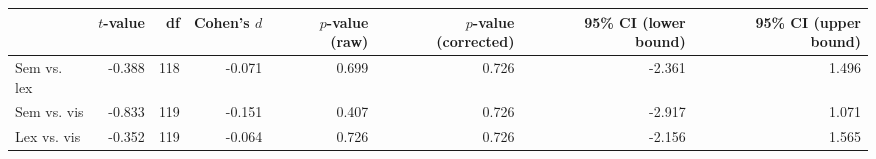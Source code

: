 \begin{tabular}{lrrrrrrr}
\toprule
 & $t$-value & df & Cohen's $d$ & $p$-value (raw) & $p$-value (corrected) & 95\% CI (lower bound) & 95\% CI (upper bound) \\
\midrule
 Sem vs. lex & -0.388 & 118 & -0.071 & 0.699 & 0.726 & -2.361 & 1.496 \\
 Sem vs. vis & -0.833 & 119 & -0.151 & 0.407 & 0.726 & -2.917 & 1.071 \\
 Lex vs. vis & -0.352 & 119 & -0.064 & 0.726 & 0.726 & -2.156 & 1.565 \\
\bottomrule
\end{tabular}